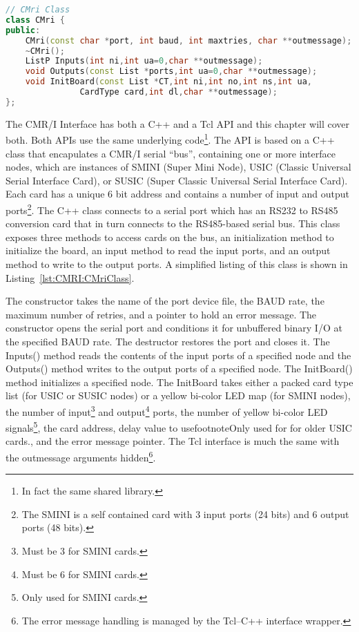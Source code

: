 \begin{lstlisting}[caption={CMri Class},
		   language=C++,label=lst:CMRI:CMriClass]
// CMri Class
class CMri {
public:
	CMri(const char *port, int baud, int maxtries, char **outmessage);
	~CMri();
	ListP Inputs(int ni,int ua=0,char **outmessage);
	void Outputs(const List *ports,int ua=0,char **outmessage);
	void InitBoard(const List *CT,int ni,int no,int ns,int ua,
		       CardType card,int dl,char **outmessage);
};
\end{lstlisting}
The CMR/I Interface has both a C++ and a Tcl API and this chapter will
cover both. Both APIs use the same underlying  code\footnote{In fact
the same shared library.}. The API is based on a C++ class that
encapulates a CMR/I serial ``bus'', containing one or more interface
nodes, which are instances of SMINI (Super Mini Node), USIC (Classic
Universal Serial Interface Card), or SUSIC (Super Classic Universal
Serial Interface Card). Each card has a unique 6 bit address and
contains a number of input and output ports\footnote{The SMINI is a
self contained card with 3 input ports (24 bits) and 6 output ports (48
bits).}. The C++ class connects to a serial port which has an RS232 to
RS485 conversion card that in turn connects to the RS485-based serial
bus. This class exposes three methods to access cards on the bus, an
initialization method to initialize the board, an input method to read
the input ports, and an output method to write to the output ports. A
simplified listing of this class is shown in
Listing~\ref{lst:CMRI:CMriClass}. 

The constructor takes the name of the port device file, the BAUD rate,
the maximum number of retries, and a pointer to hold an error message.
The constructor opens the serial port and conditions it for unbuffered
binary I/O at the specified BAUD rate. The destructor restores the port
and closes it. The Inputs() method reads the contents of the input
ports of a specified node and the Outputs() method writes to the output
ports of a specified node. The InitBoard() method initializes a
specified node. The InitBoard takes either a packed card type list (for
USIC or SUSIC nodes) or a yellow bi-color LED map (for SMINI nodes),
the number of input\footnote{Must be 3 for SMINI cards.} and
output\footnote{Must be 6 for SMINI cards.} ports, the number of yellow
bi-color LED signals\footnote{Only used for SMINI cards.}, the card
address, delay value to usefootnote{Only used for for older USIC
cards.}, and the error message pointer.  The Tcl interface is much the
same with the outmessage arguments hidden\footnote{The error message
handling is managed by the Tcl--C++ interface wrapper.}.

